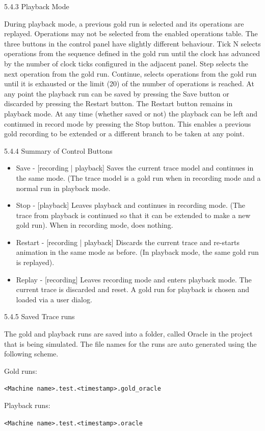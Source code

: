 5.4.3	Playback Mode

During playback mode, a previous gold run is selected and its operations are replayed. Operations may not be selected from the enabled operations table. The three buttons in the control panel have slightly different behaviour. Tick N selects operations from the sequence defined in the gold run until the clock has advanced by the number of clock ticks configured in the adjacent panel. Step selects the next operation from the gold run. Continue, selects operations from the gold run until it is exhausted or the limit (20) of the number of operations is reached.
At any point the playback run can be saved by pressing the Save button or discarded by pressing the Restart button. The Restart button remains in playback mode. At any time (whether saved or not) the playback can be left and continued in record mode by pressing the Stop button. This enables a previous gold recording to be extended or a different branch to be taken at any point.

5.4.4	Summary of Control Buttons
\begin{itemize}
\item Save - [recording | playback] Saves the current trace model and continues in the same mode. (The trace model is a gold run when in recording mode and a normal run in playback mode.
\item Stop - [playback] Leaves playback and continues in recording mode. (The trace from playback is continued so that it can be extended to make a new gold run). When in recording mode, does nothing.
\item Restart - [recording | playback] Discards the current trace and re-starts animation in the same mode as before. (In playback mode, the same gold run is replayed).
\item Replay - [recording] Leaves recording mode and enters playback mode. The current trace is discarded and reset. A gold run for playback is chosen and loaded via a user dialog.
\end{itemize}

5.4.5	Saved Trace runs

The gold and playback runs are saved into a folder, called Oracle in the project that is being simulated. The file names for the runs are auto generated using the following scheme.

Gold runs:

\texttt{<Machine name>.test.<timestamp>.gold_oracle}

Playback runs:

\texttt{<Machine name>.test.<timestamp>.oracle}


